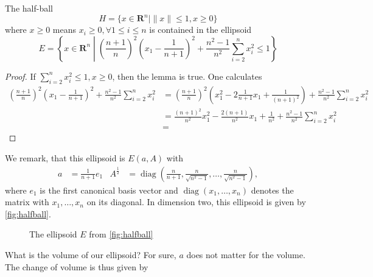 \documentclass[10pt]{article}
\newcommand{\R}{\mathbf{R}}
\newcommand{\diag}{\operatorname{diag}}
\begin{document}
\begin{lemma}\label{lem:halfball}
The half-ball
\[
H = \{x \in \R^n | \| x \| \le 1, x \ge 0 \}
\]
where $x \ge 0$ means $x_i \ge 0, \forall 1 \le i \le n$ is contained in the ellipsoid
\[
E = \left\{ x \in \R^n \middle| \left(\frac{n+1}{n}\right)^2\left(x_1 - \frac{1}{n+1}\right)^2 + \frac{n^2-1}{n^2} \sum_{i=2}^n x_i^2 \le 1 \right\}
\]
\end{lemma}
\begin{proof}
If $\sum_{i=2}^n x_i^2 \le 1, x \ge 0$, then the lemma is true. One calculates
\begin{align*}
\left(\frac{n+1}{n} \right)^2 \left(x_1-\frac{1}{n+1}\right)^2 + \frac{n^2-1}{n^2} \sum_{i=2}^n x_i^2 &= \left(\frac{n+1}{n} \right)^2 \left(x_1^2-2\frac{1}{n+1}x_1 + \frac{1}{(n+1)^2}\right) + \frac{n^2-1}{n^2} \sum_{i=2}^n x_i^2\\
&= \frac{(n+1)^2}{n^2} x_1^2-\frac{2(n+1)}{n^2}x_1 + \frac{1}{n^2} + \frac{n^2-1}{n^2} \sum_{i=2}^n x_i^2\\
&=%
\end{align*}
\end{proof}
We remark, that this ellipsoid is $E(a,A)$ with
\begin{align*}
a &= \frac{1}{n+1} e_1 &  A^{\frac{1}{2}}&= \diag \left(\frac{n}{n+1}, \frac{n}{\sqrt{n^2-1}}, \dots, \frac{n}{\sqrt{n^2-1}}\right),
\end{align*}
where $e_1$ is the first canonical basis vector and $\diag (x_1, \dots, x_n)$ denotes the matrix with $x_1, \dots, x_n$ on its diagonal. In dimension two, this ellipsoid is given by \autoref{fig:halfball}.
\begin{figure}
\centering
{}
\caption{The ellipsoid $E$ from \protect\autoref{fig:halfball}}
\label{fig:halfball}
\end{figure}
What is the volume of our ellipsoid? For sure, $a$ does not matter for the volume. The change of volume is thus given by
\end{document}
